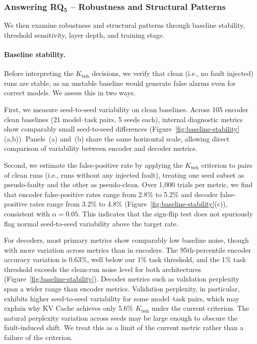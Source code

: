 \subsubsection{\textbf{Answering RQ$\mathbf{_5}$} -- Robustness and Structural Patterns}

We then examine robustness and structural patterns through baseline stability, threshold sensitivity, layer depth, and training stage.

\paragraph{Baseline stability.}
Before interpreting the $K_{\text{beh}}$ decisions, we verify that clean (i.e., no fault injected) runs are stable, as an unstable baseline would generate false alarms even for correct models. We assess this in two ways.

First, we measure seed-to-seed variability on clean baselines. Across 105 encoder clean baselines (21 model--task pairs, 5 seeds each), internal diagnostic metrics show comparably small seed-to-seed differences (Figure~\ref{fig:baseline-stability}(a,b)). Panels~(a) and~(b) share the same horizontal scale, allowing direct comparison of variability between encoder and decoder metrics.

Second, we estimate the false-positive rate by applying the $K_{\text{beh}}$ criterion to pairs of clean runs (i.e., runs without any injected fault), treating one seed subset as pseudo-faulty and the other as pseudo-clean. Over 1{,}000 trials per metric, we find that encoder false-positive rates range from 2.8\% to 5.2\% and decoder false-positive rates range from 3.2\% to 4.8\% (Figure~\ref{fig:baseline-stability}(c)), consistent with $\alpha = 0.05$. This indicates that the sign-flip test does not spuriously flag normal seed-to-seed variability above the target rate.

For decoders, most primary metrics show comparably low baseline noise, though with more variation across metrics than in encoders. The 95th-percentile encoder accuracy variation is 0.63\%, well below our 1\% task threshold, and the 1\% task threshold exceeds the clean-run noise level for both architectures (Figure~\ref{fig:baseline-stability}). Decoder metrics such as validation perplexity span a wider range than encoder metrics. Validation perplexity, in particular, exhibits higher seed-to-seed variability for some model--task pairs, which may explain why KV Cache achieves only 5.6\% $K_{\text{beh}}$ under the current criterion. The natural perplexity variation across seeds may be large enough to obscure the fault-induced shift. We treat this as a limit of the current metric rather than a failure of the criterion.

